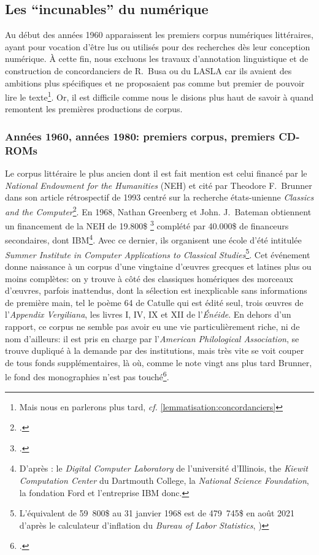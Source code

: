 \subsection{Les \enquote{incunables} du numérique}

Au début des années 1960 apparaissent les premiers corpus numériques littéraires, ayant pour vocation d'être lus ou utilisés pour des recherches dès leur conception numérique. À cette fin, nous excluons les travaux d'annotation linguistique et de construction de concordanciers de R.~Busa ou du LASLA  car ils avaient des ambitions plus spécifiques et ne proposaient pas comme but premier de pouvoir lire le texte\footnote{Mais nous en parlerons plus tard, \textit{cf.} \ref{lemmatisation:concordanciers}}. Or, il est difficile comme nous le disions plus haut de savoir à quand remontent les premières productions de corpus.


\subsubsection{Années 1960, années 1980: premiers corpus, premiers CD-ROMs}

Le corpus littéraire le plus ancien dont il est fait mention est celui financé par le \textit{National Endowment for the Humanities} (NEH) et cité par Theodore F.~Brunner dans son article rétrospectif de 1993 centré sur la recherche états-unienne \textit{Classics and the Computer}\footcite{brunner_classics_1993}. En 1968, Nathan Greenberg et John. J.~Bateman obtiennent un financement de la NEH de 19.800\$ \footcite{noauthor_neh_2018} complété par 40.000\$ de financeurs secondaires, dont IBM\footnote{D'après \cite{brunner_classics_1993}: le \textit{Digital Computer Laboratory} de l'université d'Illinois, the \textit{Kiewit Computation Center} du Dartmouth College, la \textit{National Science Foundation}, la fondation Ford et l'entreprise IBM donc.}. Avec ce dernier, ils organisent une école d'été intitulée \textit{Summer Institute in Computer Applications to Classical Studies}\footnote{L'équivalent de 59~800\$ au 31 janvier 1968 est de 479~745\$ en août 2021 d'après le calculateur d'inflation du \textit{Bureau of Labor Statistics}, \cite{noauthor_cpi_nodate})}. Cet événement donne naissance à un corpus d'une vingtaine d'œuvres grecques et latines plus ou moins complètes: on y trouve à côté des classiques homériques des morceaux d'œuvres, parfois inattendus, dont la sélection est inexplicable sans informations de première main, tel le poème 64 de Catulle qui est édité seul, trois œuvres de l'\textit{Appendix Vergiliana}, les livres I, IV, IX et XII de l'\textit{Énéide}. En dehors d'un rapport, ce corpus ne semble pas avoir eu une vie particulièrement riche, ni de nom d'ailleurs: il est pris en charge par l'\textit{American Philological Association}, se trouve dupliqué à la demande par des institutions, mais très vite se voit couper de tous fonds supplémentaires, là où, comme le note vingt ans plus tard Brunner, le fond des monographies n'est pas touché\footcite{brunner_classics_1993}.

